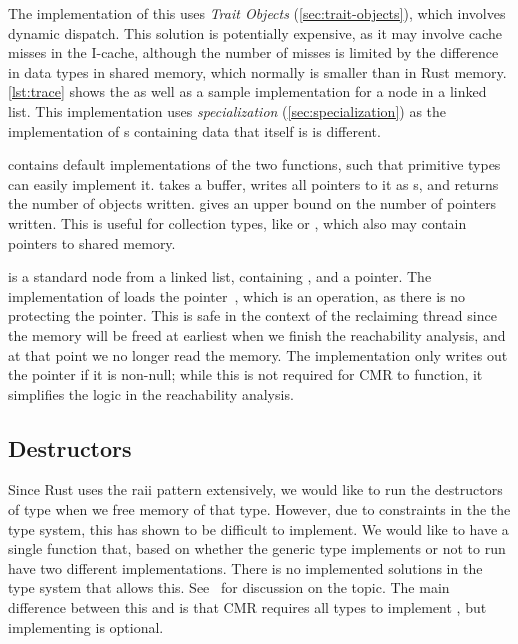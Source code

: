 The implementation of this uses \emph{Trait Objects} (\cref{sec:trait-objects}), which involves
dynamic dispatch. This solution is potentially expensive, as it may involve cache misses in the
I-cache, although the number of misses is limited by the difference in data types in shared memory,
which normally is smaller than in Rust memory. \cref{lst:trace} shows the  as well as a
sample implementation for a node in a linked list.  This implementation uses \emph{specialization}
(\cref{sec:specialization}) as the implementation of s containing data that itself is
 is different.

\begin{figure}[ht]
  
\end{figure}

 contains default implementations of the two functions, such that primitive types can
easily implement it.  takes a buffer, writes all pointers to it as s,
and returns the number of objects written.  gives an upper bound on the number of
pointers written. This is useful for collection types, like  or , which
also may contain pointers to shared memory.

 is a standard node from a linked list, containing , and a 
pointer. The implementation of  loads the  pointer~, which is
an  operation, as there is no  protecting the pointer. This is safe in the
context of the reclaiming thread since the memory will be freed at earliest when we finish the reachability
analysis, and at that point we no longer read the memory. The implementation only writes out the
pointer if it is non-null; while this is not required for CMR to function, it simplifies the logic
in the reachability analysis.


\subsection{Destructors}

Since Rust uses the \gls{raii} pattern extensively, we would like to run the destructors of type
when we free memory of that type. However, due to constraints in the the type system, this has
shown to be difficult to implement. We would like to have a single function  that,
based on whether the generic type  implements  or not to run have two different
implementations. There is no implemented solutions in the type system that allows this.
See~\cite{rust-impl-overlap} for discussion on the topic.
The main difference between this and  is that CMR requires all types to implement
, but implementing  is optional.














